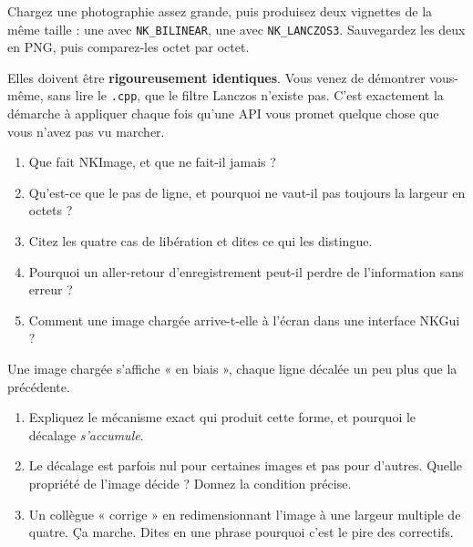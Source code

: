 \begin{nkdemo}
Chargez une photographie assez grande, puis produisez deux vignettes de la même
taille : une avec \texttt{NK\_BILINEAR}, une avec \texttt{NK\_LANCZOS3}.
Sauvegardez les deux en PNG, puis comparez-les octet par octet.

Elles doivent être \textbf{rigoureusement identiques}. Vous venez de démontrer
vous-même, sans lire le \texttt{.cpp}, que le filtre Lanczos n'existe pas. C'est
exactement la démarche à appliquer chaque fois qu'une API vous promet quelque
chose que vous n'avez pas vu marcher.
\end{nkdemo}

\begin{nkquestions}
\begin{enumerate}
\item Que fait NKImage, et que ne fait-il jamais ?
\item Qu'est-ce que le pas de ligne, et pourquoi ne vaut-il pas toujours la
      largeur en octets ?
\item Citez les quatre cas de libération et dites ce qui les distingue.
\item Pourquoi un aller-retour d'enregistrement peut-il perdre de
      l'information sans erreur ?
\item Comment une image chargée arrive-t-elle à l'écran dans une interface
      NKGui ?
\end{enumerate}
\end{nkquestions}

\begin{nklogique}
Une image chargée s'affiche « en biais », chaque ligne décalée un peu plus que
la précédente.

\begin{enumerate}
\item Expliquez le mécanisme exact qui produit cette forme, et pourquoi le
      décalage \emph{s'accumule}.
\item Le décalage est parfois nul pour certaines images et pas pour d'autres.
      Quelle propriété de l'image décide ? Donnez la condition précise.
\item Un collègue « corrige » en redimensionnant l'image à une largeur multiple
      de quatre. Ça marche. Dites en une phrase pourquoi c'est le pire des
      correctifs.
\end{enumerate}
\end{nklogique}
